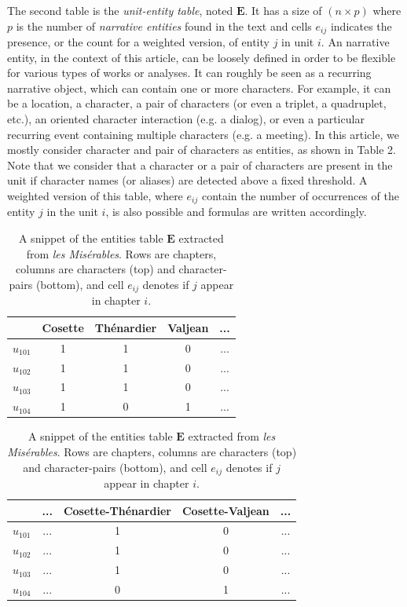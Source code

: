 \documentclass[
twocolumn,
]{ceurart}
\begin{document}
The second table is the \emph{unit-entity table}, noted $\mathbf{E}$. It has a size of $(n \times p)$ where $p$ is the number of \emph{narrative entities} found in the text and cells $e_{ij}$ indicates the presence, or the count for a weighted version, of entity $j$ in unit $i$. An narrative entity, in the context of this article, can be loosely defined in order to be flexible for various types of works or analyses. It can roughly be seen as a recurring narrative object, which can contain one or more characters. For example, it can be a location, a character, a pair of characters (or even a triplet, a quadruplet, etc.), an oriented character interaction (e.g. a dialog), or even a particular recurring event containing multiple characters (e.g. a meeting). In this article, we mostly consider character and pair of characters as entities, as shown in Table 2. Note that we consider that a character or a pair of characters are present in the unit if character names (or aliases) are detected above a fixed threshold. A weighted version of this table, where $e_{ij}$ contain the number of occurrences of the entity $j$ in the unit $i$, is also possible and formulas are written accordingly.

\begin{table}[h]
	\scriptsize
	\begin{tabular}{|c||c|c|c|c|}
		\hline
		& Cosette & Thénardier & Valjean & ... \\
		\hline
		\hline 
		$u_{101}$ & 1 & 1 & 0 & ... \\
		\hline
		$u_{102}$ & 1 & 1 & 0 & ... \\
		\hline
		$u_{103}$ & 1 & 1 & 0 & ... \\
		\hline
		$u_{104}$ & 1 & 0 & 1 & ... \\
		\hline
	\end{tabular}
	\begin{tabular}{|c||c|c|c|c|}
		\hline
		& ... & Cosette-Thénardier & Cosette-Valjean & ... \\
		\hline
		\hline 
		$u_{101}$  	& ... & 1 & 0 &  ... \\
		\hline
		$u_{102}$ 	& ... & 1 & 0 & ... \\
		\hline
		$u_{103}$  	& ... & 1 & 0 & ... \\
		\hline
		$u_{104}$ 	& ... & 0 & 1 & ... \\
		\hline
	\end{tabular}
	\label{occ_table}
	\caption{A snippet of the entities table $\mathbf{E}$ extracted from \emph{les Misérables}. Rows are chapters, columns are characters (top) and character-pairs (bottom), and cell $e_{ij}$ denotes if $j$ appear in chapter $i$.}
\end{table}
\end{document}
